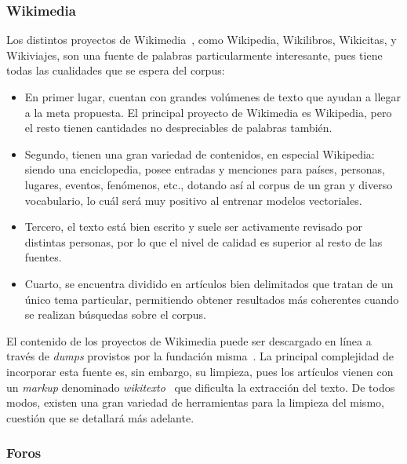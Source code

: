 \subsubsection{Wikimedia}

Los distintos proyectos de Wikimedia~\cite{Wikimedia}, como Wikipedia, Wikilibros, Wikicitas, y
Wikiviajes, son una fuente de palabras particularmente interesante, pues tiene todas las cualidades
que se espera del corpus:

\begin{itemize}

\item En primer lugar, cuentan con grandes volúmenes de texto que ayudan a llegar a la meta
propuesta. El principal proyecto de Wikimedia es Wikipedia, pero el resto tienen cantidades no
despreciables de palabras también.

\item Segundo, tienen una gran variedad de contenidos, en especial Wikipedia: siendo una
enciclopedia, posee entradas y menciones para países, personas, lugares, eventos, fenómenos, etc.,
dotando así al corpus de un gran y diverso vocabulario, lo cuál será muy positivo al entrenar
modelos vectoriales.

\item Tercero, el texto está bien escrito y suele ser activamente revisado por distintas personas,
por lo que el nivel de calidad es superior al resto de las fuentes.

\item Cuarto, se encuentra dividido en artículos bien delimitados que tratan de un único tema
particular, permitiendo obtener resultados más coherentes cuando se realizan búsquedas sobre el
corpus.

\end{itemize}


El contenido de los proyectos de Wikimedia puede ser descargado en línea a través de \textit{dumps}
provistos por la fundación misma~\cite{WikiDump}. La principal complejidad de incorporar esta fuente
es, sin embargo, su limpieza, pues los artículos vienen con un \textit{markup} denominado
\textit{wikitexto}~\cite{Wikitext} que dificulta la extracción del texto. De todos modos, existen
una gran variedad de herramientas para la limpieza del mismo, cuestión que se detallará más
adelante.


\subsubsection{Foros}

